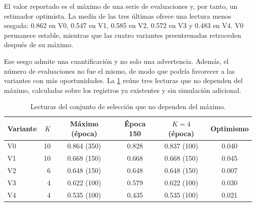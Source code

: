 El valor reportado es el m\'aximo de una serie de evaluaciones y, por tanto, un estimador
optimista. La media de las tres \'ultimas ofrece una lectura menos sesgada: \num{0.862} en
V0, \num{0.547} en V1, \num{0.585} en V2, \num{0.572} en V3 y \num{0.483} en V4. V0
permanece estable, mientras que las cuatro variantes preentrenadas retroceden despu\'es de
su m\'aximo.

Ese sesgo admite una cuantificaci\'on y no solo una advertencia. Adem\'as, el n\'umero de
evaluaciones no fue el mismo, de modo que podr\'ia favorecer a las variantes con m\'as
oportunidades. La \cref{tab:seleccion-sesgo} re\'une tres lecturas que no dependen del
m\'aximo, calculadas sobre los registros ya existentes y sin simulaci\'on adicional.

\begin{table}[htbp]
  \centering
  \caption{Lecturas del conjunto de selecci\'on que no dependen del m\'aximo.}
  \label{tab:seleccion-sesgo}
  \small
  \begin{tabular}{lrcccc}
    \toprule
    Variante & $K$ & M\'aximo (\'epoca) & \'Epoca \num{150} & $K = \num{4}$ (\'epoca) &
      Optimismo \\
    \midrule
    V0 & \num{10} & \num{0.864} (\num{350}) & \num{0.828} & \num{0.837} (\num{100}) &
      \num{0.040} \\
    V1 & \num{10} & \num{0.668} (\num{150}) & \num{0.668} & \num{0.668} (\num{150}) &
      \num{0.045} \\
    V2 & \num{6}  & \num{0.648} (\num{150}) & \num{0.648} & \num{0.648} (\num{150}) &
      \num{0.007} \\
    V3 & \num{4}  & \num{0.622} (\num{100}) & \num{0.579} & \num{0.622} (\num{100}) &
      \num{0.030} \\
    V4 & \num{4}  & \num{0.535} (\num{100}) & \num{0.435} & \num{0.535} (\num{100}) &
      \num{0.021} \\
    \bottomrule
  \end{tabular}
\end{table}

